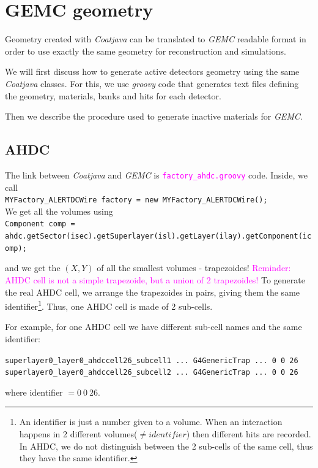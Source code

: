 \pagestyle{headings}
\chapter{GEMC geometry}
Geometry created with \textit{Coatjava} can be translated to \textit{GEMC} readable format in order to use exactly the same geometry for reconstruction and simulations.

We will first discuss how to generate active detectors geometry using the same \textit{Coatjava} classes. For this, we use \textit{groovy} code that generates text files defining the geometry, materials, banks and hits for each detector.

Then we describe the procedure used to generate inactive materials for \textit{GEMC}.

\section{AHDC}
The link between \textit{Coatjava} and \textit{GEMC} is \textcolor{magenta}{\texttt{factory\_ahdc.groovy}} code. Inside, we call \\ 
\texttt{MYFactory\_ALERTDCWire factory = new MYFactory\_ALERTDCWire();} \\ 
We get all the volumes using \\
\texttt{Component comp = } \\ \texttt{ahdc.getSector(isec).getSuperlayer(isl).getLayer(ilay).getComponent(icomp);}

and we get the $(X,Y)$ of all the smallest volumes - trapezoides! \textcolor{magenta}{Reminder: AHDC cell is not a simple trapezoide, but a union of 2 trapezoides!} To generate the real AHDC cell, we arrange the trapezoides in pairs, giving them the same identifier\footnote{An identifier is just a number given to a volume. When an interaction happens in 2 different volumes($\neq identifier$) then different hits are recorded. In AHDC, we do not distinguish between the 2 sub-cells of the same cell, thus they have the same identifier.}. Thus, one AHDC cell is made of 2 sub-cells.

For example, for one AHDC cell we have different sub-cell names and the same identifier:

\texttt{superlayer0\_layer0\_ahdccell26\_subcell1 ... G4GenericTrap ... 0 0 26}\\
\texttt{superlayer0\_layer0\_ahdccell26\_subcell2 ... G4GenericTrap ... 0 0 26}

where identifier $= 0 \ 0 \ 26$.

